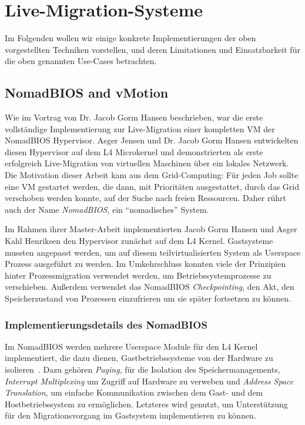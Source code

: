 \section{Live-Migration-Systeme}
Im Folgenden wollen wir einige konkrete Implementierungen der oben
vorgestellten Techniken vorstellen, und deren Limitationen und
Einsatzbarkeit für die oben genannten Use-Cases betrachten.

\subsection{NomadBIOS and vMotion}
\label{sec:nomadbios--vmware}
Wie im Vortrag von Dr. Jacob Gorm Hansen beschrieben, war die erste
vollständige Implementierung zur Live-Migration einer kompletten VM
der NomadBIOS Hypervisor. Asger Jensen und Dr. Jacob Gorm Hansen
entwickelten diesen Hypervisor auf dem L4 Microkernel und
demonstrierten als erste erfolgreich Live-Migration von virtuellen
Maschinen über ein lokales Netzwerk. Die Motivation dieser Arbeit kam
aus dem Grid-Computing: Für jeden Job sollte eine VM gestartet werden,
die dann, mit Prioritäten ausgestattet, durch das Grid verschoben
werden konnte, auf der Suche nach freien Ressourcen. Daher rührt auch
der Name \emph{NomadBIOS}, ein "`nomadisches"' System.

Im Rahmen ihrer Master-Arbeit implementierten Jacob Gorm Hansen und
Asger Kahl Henriksen den Hypervisor zunächst auf dem L4
Kernel. Gastsysteme mussten angepasst werden, um auf diesem
teilvirtualisierten System als Userspace Prozess ausgeführt zu
werden. Im Umkehrschluss konnten viele der Prinzipien hinter
Prozessmigration verwendet werden, um Betriebssystemprozesse zu
verschieben. Außerdem verwendet das NomadBIOS \emph{Checkpointing},
den Akt, den Speicherzustand von Prozessen einzufrieren um sie später
fortsetzen zu können.

\subsubsection{Implementierungsdetails des NomadBIOS}
\label{sec:impl-des-nomadb}
Im NomadBIOS werden mehrere Userspace Module für den L4 Kernel
implementiert, die dazu dienen, Gastbetriebssysteme von der Hardware
zu isolieren~\cite{hansen2002nomadic}. Dazu gehören \emph{Paging}, für
die Isolation des Speichermanagements, \emph{Interrupt Multiplexing}
um Zugriff auf Hardware zu verweben und \emph{Address Space
  Translation}, um einfache Kommunikation zwischen dem Gast- und dem
Hostbetriebssystem zu ermöglichen. Letzteres wird genutzt, um
Unterstützung für den Migrationsvorgang im Gastsystem implementieren
zu können.

